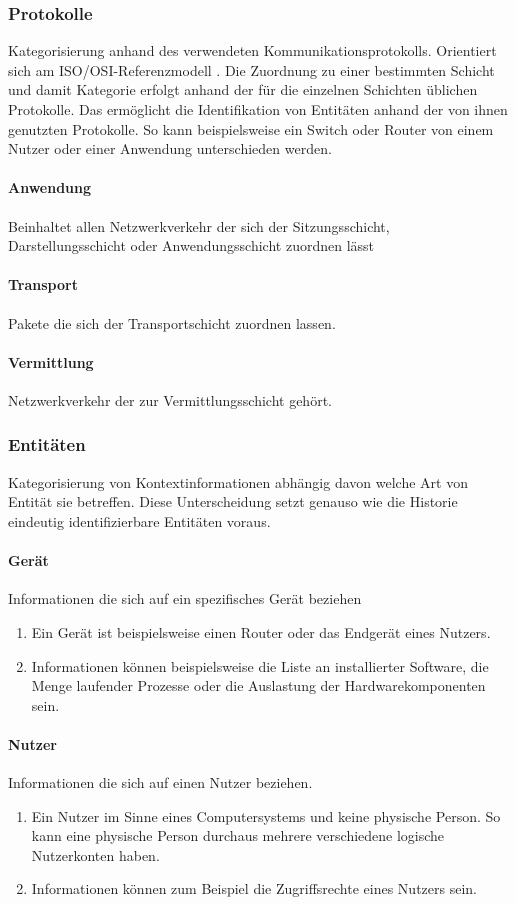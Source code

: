 \subsubsection{Protokolle}
Kategorisierung anhand des verwendeten Kommunikationsprotokolls. Orientiert sich am ISO/OSI-Referenzmodell \cite{day1983osi}. Die Zuordnung zu einer bestimmten Schicht und damit Kategorie erfolgt anhand der für die einzelnen Schichten üblichen Protokolle. Das ermöglicht die Identifikation von Entitäten anhand der von ihnen genutzten Protokolle. So kann beispielsweise ein Switch oder Router von einem Nutzer oder einer Anwendung unterschieden werden.
\paragraph{Anwendung}
Beinhaltet allen Netzwerkverkehr der sich der Sitzungsschicht, Darstellungsschicht oder Anwendungsschicht zuordnen lässt 
\paragraph{Transport}
Pakete die sich der Transportschicht zuordnen lassen.
\paragraph{Vermittlung}
Netzwerkverkehr der zur Vermittlungsschicht gehört.
\subsubsection{Entitäten}
Kategorisierung von Kontextinformationen abhängig davon welche Art von Entität sie betreffen.
Diese Unterscheidung setzt genauso wie die Historie eindeutig identifizierbare Entitäten voraus.
\paragraph{Gerät}
Informationen die sich auf ein spezifisches Gerät beziehen
\begin{enumerate}
\item{Ein Gerät ist beispielsweise einen Router oder das Endgerät eines Nutzers. }
\item{Informationen können beispielsweise die Liste an installierter Software, die Menge laufender Prozesse oder die Auslastung der Hardwarekomponenten sein.}
\end{enumerate}
\paragraph{Nutzer}
Informationen die sich auf einen Nutzer beziehen.
\begin{enumerate}
\item{Ein Nutzer im Sinne eines Computersystems und keine physische Person. So kann eine physische Person durchaus mehrere verschiedene logische Nutzerkonten haben. }
\item{Informationen können zum Beispiel die Zugriffsrechte eines Nutzers sein.}
\end{enumerate}

